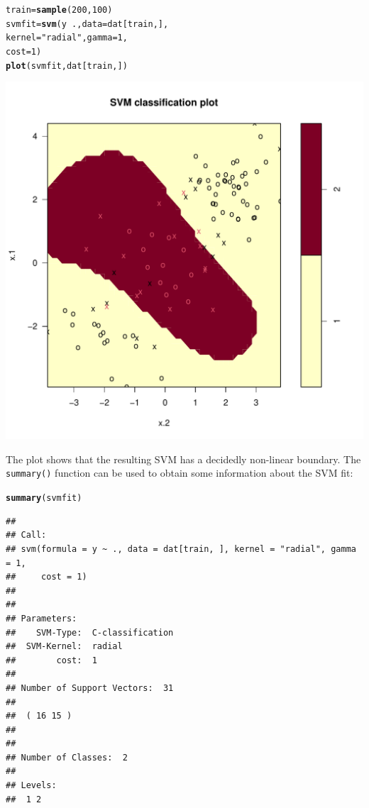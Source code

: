 \documentclass[12pt]{article}\usepackage[]{graphicx}\usepackage[]{color}
\makeatletter
\def\maxwidth{ %
  \ifdim\Gin@nat@width>\linewidth
    \linewidth
  \else
    \Gin@nat@width
  \fi
}
\newcommand{\hlnum}[1]{\textcolor[rgb]{0.686,0.059,0.569}{#1}}%
\newcommand{\hlstr}[1]{\textcolor[rgb]{0.192,0.494,0.8}{#1}}%
\newcommand{\hlopt}[1]{\textcolor[rgb]{0,0,0}{#1}}%
\newcommand{\hlstd}[1]{\textcolor[rgb]{0.345,0.345,0.345}{#1}}%
\newcommand{\hlkwb}[1]{\textcolor[rgb]{0.69,0.353,0.396}{#1}}%
\newcommand{\hlkwc}[1]{\textcolor[rgb]{0.333,0.667,0.333}{#1}}%
\newcommand{\hlkwd}[1]{\textcolor[rgb]{0.737,0.353,0.396}{\textbf{#1}}}%
\newenvironment{kframe}{%
 \def\at@end@of@kframe{}%
 \ifinner\ifhmode%
  \def\at@end@of@kframe{\end{minipage}}%
  \begin{minipage}{\columnwidth}%
 \fi\fi%
 \def\FrameCommand##1{\hskip\@totalleftmargin \hskip-\fboxsep
 \colorbox{shadecolor}{##1}\hskip-\fboxsep
     \hskip-\linewidth \hskip-\@totalleftmargin \hskip\columnwidth}%
 \MakeFramed {\advance\hsize-\width
   \@totalleftmargin\z@ \linewidth\hsize
   \@setminipage}}%
 {\par\unskip\endMakeFramed%
 \at@end@of@kframe}
\newenvironment{knitrout}{}{} %
\makeatother
\begin{document}
\begin{knitrout}
\color{fgcolor}\begin{kframe}
\begin{alltt}
\hlstd{train} \hlkwb{=} \hlkwd{sample}\hlstd{(}\hlnum{200}\hlstd{,}\hlnum{100}\hlstd{)}
\hlstd{svmfit}\hlkwb{=}\hlkwd{svm}\hlstd{(y}\hlopt{~}\hlstd{.,} \hlkwc{data}\hlstd{=dat[train,],}
           \hlkwc{kernel}\hlstd{=}\hlstr{"radial"}\hlstd{,} \hlkwc{gamma}\hlstd{=}\hlnum{1}\hlstd{,}
           \hlkwc{cost}\hlstd{=}\hlnum{1}\hlstd{)}
\hlkwd{plot}\hlstd{(svmfit, dat[train,])}
\end{alltt}
\end{kframe}
\includegraphics[width=\maxwidth]{figure/unnamed-chunk-19-1} 

\end{knitrout}

The plot shows that the resulting SVM has a decidedly non-linear boundary. The \texttt{summary()} function can be used to obtain some information about the SVM fit:

\begin{knitrout}
\color{fgcolor}\begin{kframe}
\begin{alltt}
\hlkwd{summary}\hlstd{(svmfit)}
\end{alltt}
\begin{verbatim}
## 
## Call:
## svm(formula = y ~ ., data = dat[train, ], kernel = "radial", gamma = 1, 
##     cost = 1)
## 
## 
## Parameters:
##    SVM-Type:  C-classification 
##  SVM-Kernel:  radial 
##        cost:  1 
## 
## Number of Support Vectors:  31
## 
##  ( 16 15 )
## 
## 
## Number of Classes:  2 
## 
## Levels: 
##  1 2
\end{verbatim}
\end{kframe}
\end{knitrout}
\end{document}
